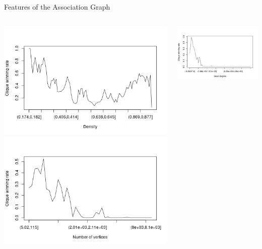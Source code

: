 \documentclass{beamer}
\begin{document}
\begin{frame}{Features of the Association Graph}
  \pause
  \begin{columns}
    \begin{column}{0.5\textwidth}
      \centering
      \includegraphics[width=\textwidth,height=0.4\textheight,keepaspectratio]{../dissertation/images/density_bins.png}
      \includegraphics[width=\textwidth,height=0.4\textheight,keepaspectratio]{../dissertation/images/vertices_bins.png}
    \end{column}
    \begin{column}{0.5\textwidth}
      \centering
      \includegraphics[width=\textwidth,height=0.4\textheight,keepaspectratio]{../dissertation/images/meandeg_bins.png}

\end{column}
\end{columns}
\end{frame}
\end{document}
